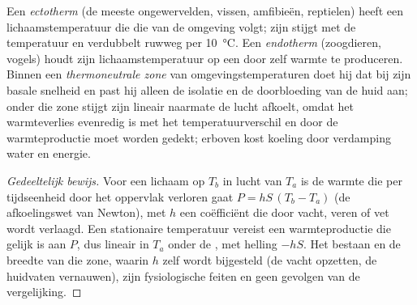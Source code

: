 \begin{proposition}\label{prop:b1:organism-environment:thermo}
Een \emph{ectotherm} (de meeste ongewervelden, vissen,
amfibieën, reptielen) heeft een lichaamstemperatuur die die van de omgeving
volgt; zijn  stijgt met de temperatuur en verdubbelt
ruwweg per \qty{10}{\celsius}. Een \emph{endotherm}
(zoogdieren, vogels) houdt zijn lichaamstemperatuur op een  door
zelf warmte te produceren. Binnen een \emph{thermoneutrale
zone} van omgevingstemperaturen doet hij dat bij
zijn basale snelheid en past hij alleen de isolatie en de doorbloeding van de
huid aan; onder die zone stijgt zijn  lineair naarmate
de lucht afkoelt, omdat het warmteverlies evenredig is met het
temperatuurverschil en door de warmteproductie moet worden gedekt; erboven
kost koeling door verdamping water en energie.
\end{proposition}
\begin{proof}[Gedeeltelijk bewijs]
Voor een lichaam op $T_b$ in lucht van $T_a$ is de warmte die per tijdseenheid
door het oppervlak verloren gaat $P = hS\,(T_b - T_a)$ (de afkoelingswet van
Newton), met $h$ een coëfficiënt die door vacht, veren of vet wordt verlaagd.
Een stationaire temperatuur vereist een warmteproductie die gelijk is aan $P$,
dus lineair in $T_a$ onder de , met helling $-hS$. Het
bestaan en de breedte van die zone, waarin $h$ zelf wordt bijgesteld (de vacht
opzetten, de huidvaten vernauwen), zijn fysiologische feiten en geen gevolgen
van de vergelijking.
\end{proof}


